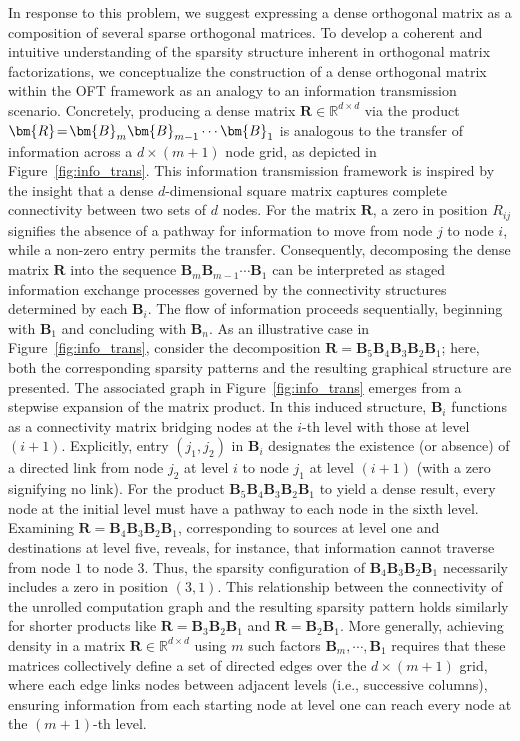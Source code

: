 In response to this problem, we suggest expressing a dense orthogonal matrix as a composition of several sparse orthogonal matrices. To develop a coherent and intuitive understanding of the sparsity structure inherent in orthogonal matrix factorizations, we conceptualize the construction of a dense orthogonal matrix within the OFT framework as an analogy to an information transmission scenario. Concretely, producing a dense matrix $\bm{R}\in\mathbb{R}^{d\times d}$ via the product $\thickmuskip=2mu \medmuskip=2mu \bm{R}=\bm{B}_m\bm{B}_{m-1}\cdots\bm{B}_1$ is analogous to the transfer of information across a $d\times(m+1)$ node grid, as depicted in Figure~\ref{fig:info_trans}. This information transmission framework is inspired by the insight that a dense $d$-dimensional square matrix captures complete connectivity between two sets of $d$ nodes. For the matrix $\bm{R}$, a zero in position $R_{ij}$ signifies the absence of a pathway for information to move from node $j$ to node $i$, while a non-zero entry permits the transfer. Consequently, decomposing the dense matrix $\bm{R}$ into the sequence $\bm{B}_m\bm{B}_{m-1}\cdots\bm{B}_1$ can be interpreted as staged information exchange processes governed by the connectivity structures determined by each $\bm{B}_i$. The flow of information proceeds sequentially, beginning with $\bm{B}_1$ and concluding with $\bm{B}_n$. As an illustrative case in Figure~\ref{fig:info_trans}, consider the decomposition $\bm{R}=\bm{B}_5\bm{B}_4\bm{B}_3\bm{B}_2\bm{B}_1$; here, both the corresponding sparsity patterns and the resulting graphical structure are presented. The associated graph in Figure~\ref{fig:info_trans} emerges from a stepwise expansion of the matrix product. In this induced structure, $\bm{B}_i$ functions as a connectivity matrix bridging nodes at the $i$-th level with those at level $(i+1)$. Explicitly, entry $(j_1, j_2)$ in $\bm{B}_i$ designates the existence (or absence) of a directed link from node $j_2$ at level $i$ to node $j_1$ at level $(i+1)$ (with a zero signifying no link). For the product $\bm{B}_5\bm{B}_4\bm{B}_3\bm{B}_2\bm{B}_1$ to yield a dense result, every node at the initial level must have a pathway to each node in the sixth level. Examining $\bm{R}=\bm{B}_4\bm{B}_3\bm{B}_2\bm{B}_1$, corresponding to sources at level one and destinations at level five, reveals, for instance, that information cannot traverse from node $1$ to node $3$. Thus, the sparsity configuration of $\bm{B}_4\bm{B}_3\bm{B}_2\bm{B}_1$ necessarily includes a zero in position $(3,1)$. This relationship between the connectivity of the unrolled computation graph and the resulting sparsity pattern holds similarly for shorter products like $\bm{R}=\bm{B}_3\bm{B}_2\bm{B}_1$ and $\bm{R}=\bm{B}_2\bm{B}_1$. More generally, achieving density in a matrix $\bm{R}\in\mathbb{R}^{d\times d}$ using $m$ such factors $\bm{B}_m,\cdots,\bm{B}_1$ requires that these matrices collectively define a set of directed edges over the $d\times (m+1)$ grid, where each edge links nodes between adjacent levels (i.e., successive columns), ensuring information from each starting node at level one can reach every node at the $(m+1)$-th level.

